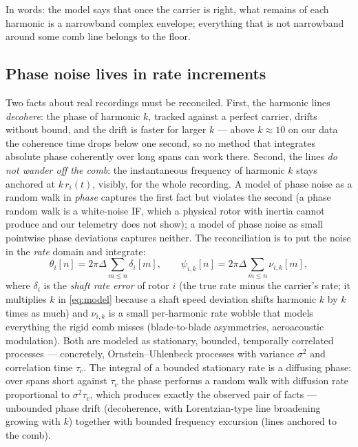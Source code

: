\documentclass[journal]{IEEEtran}
\begin{document}
In words: the model says that once the carrier is right, what remains of
each harmonic is a narrowband complex envelope; everything that is not
narrowband around some comb line belongs to the floor.

\subsection{Phase noise lives in rate increments}
\label{sec:model-phasenoise}

Two facts about real recordings must be reconciled. First, the harmonic
lines \emph{decohere}: the phase of harmonic $k$, tracked against a
perfect carrier, drifts without bound, and the drift is faster for
larger $k$ --- above $k \approx 10$ on our data the coherence time drops
below one second, so no method that integrates absolute phase coherently
over long spans can work there. Second, the lines \emph{do not wander
off the comb}: the instantaneous frequency of harmonic $k$ stays
anchored at $k\,r_i(t)$, visibly, for the whole recording. A model of
phase noise as a random walk in \emph{phase} captures the first fact but
violates the second (a phase random walk is a white-noise IF, which a
physical rotor with inertia cannot produce and our telemetry does not
show); a model of phase noise as small pointwise phase deviations
captures neither. The reconciliation is to put the noise in the
\emph{rate} domain and integrate:
\begin{equation}
  \theta_i[n] = 2\pi\Delta \sum_{m\le n} \delta_i[m],
  \qquad
  \psi_{i,k}[n] = 2\pi\Delta \sum_{m\le n} \nu_{i,k}[m],
  \label{eq:phase-integrals}
\end{equation}
where $\delta_i$ is the \emph{shaft rate error} of rotor $i$ (the true
rate minus the carrier's rate; it multiplies $k$ in \eqref{eq:model}
because a shaft speed deviation shifts harmonic $k$ by $k$ times as
much) and $\nu_{i,k}$ is a small per-harmonic rate wobble that models
everything the rigid comb misses (blade-to-blade asymmetries,
aeroacoustic modulation). Both are modeled as stationary, bounded,
temporally correlated processes --- concretely, Ornstein--Uhlenbeck
processes with variance $\sigma^2$ and correlation time $\tau_c$. The
integral of a bounded stationary rate is a diffusing phase: over spans
short against $\tau_c$ the phase performs a random walk with diffusion
rate proportional to $\sigma^2 \tau_c$, which produces exactly the
observed pair of facts --- unbounded phase drift (decoherence, with
Lorentzian-type line broadening growing with $k$) together with bounded
frequency excursion (lines anchored to the comb).
\end{document}
